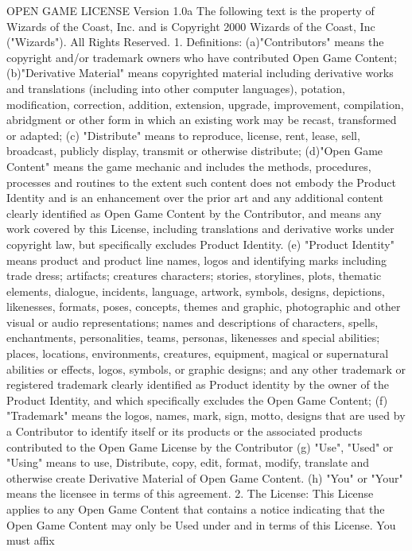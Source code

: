\begin{multicols}{2}
OPEN GAME LICENSE Version 1.0a
The following text is the property of Wizards of
the Coast, Inc. and is Copyright 2000 Wizards of
the Coast, Inc ("Wizards"). All Rights Reserved.
1. Definitions: (a)"Contributors" means the
copyright and/or trademark owners who have
contributed Open Game Content; (b)"Derivative
Material" means copyrighted material including
derivative works and translations (including into
other computer languages), potation,
modification, correction, addition, extension,
upgrade, improvement, compilation, abridgment
or other form in which an existing work may be
recast, transformed or adapted; (c) "Distribute"
means to reproduce, license, rent, lease, sell,
broadcast, publicly display, transmit or otherwise
distribute; (d)"Open Game Content" means the
game mechanic and includes the methods,
procedures, processes and routines to the extent
such content does not embody the Product
Identity and is an enhancement over the prior art
and any additional content clearly identified as
Open Game Content by the Contributor, and
means any work covered by this License,
including translations and derivative works under
copyright law, but specifically excludes Product
Identity. (e) "Product Identity" means product
and product line names, logos and identifying
marks including trade dress; artifacts; creatures
characters; stories, storylines, plots, thematic
elements, dialogue, incidents, language, artwork,
symbols, designs, depictions, likenesses, formats,
poses, concepts, themes and graphic,
photographic and other visual or audio
representations; names and descriptions of
characters, spells, enchantments, personalities,
teams, personas, likenesses and special abilities;
places, locations, environments, creatures,
equipment, magical or supernatural abilities or
effects, logos, symbols, or graphic designs; and
any other trademark or registered trademark
clearly identified as Product identity by the
owner of the Product Identity, and which
specifically excludes the Open Game Content; (f)
"Trademark" means the logos, names, mark, sign,
motto, designs that are used by a Contributor to
identify itself or its products or the associated
products contributed to the Open Game License
by the Contributor (g) "Use", "Used" or "Using"
means to use, Distribute, copy, edit, format,
modify, translate and otherwise create Derivative
Material of Open Game Content. (h) "You" or
"Your" means the licensee in terms of this
agreement.
2. The License: This License applies to any Open
Game Content that contains a notice indicating
that the Open Game Content may only be Used
under and in terms of this License. You must affix

\end{multicols}
